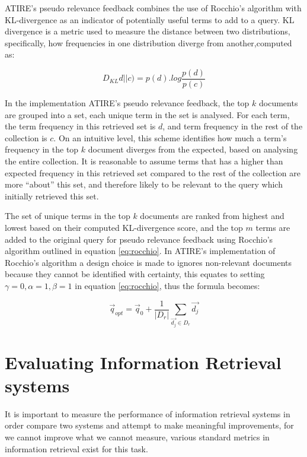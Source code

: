 ATIRE's pseudo relevance feedback combines the use of Rocchio's algorithm with KL-divergence as an indicator of potentially useful terms to add to a query. KL divergence is a metric used to measure the distance between two distributions, specifically, how frequencies in one distribution diverge from another,computed as:

\begin{equation}
D_{KL}{d||c)}= p(d).log\frac{p(d)}{p(c)}
\end{equation}


In the implementation ATIRE's pseudo relevance feedback, the top $k$ documents are grouped into a set, each unique term in the set is analysed. For each term, the term frequency in this retrieved set is $d$, and  term frequency in the rest of the collection is $c$.  On an intuitive level, this scheme identifies how much a term's frequency in the top $k$ document diverges from the expected, based on analysing the entire collection.  It is reasonable to assume terms that has a higher than expected frequency in this retrieved set compared to the rest of the collection are more ``about'' this set, and therefore likely to be relevant to the query which initially retrieved this set. 

The set of unique terms in the top $k$ documents are ranked from highest and lowest based on their computed KL-divergence score, and the top $m$ terms are added to the original query for pseudo relevance feedback using Rocchio's algorithm outlined in equation \ref{eq:rocchio}. In ATIRE's implementation of Rocchio's algorithm a design choice is made to ignores non-relevant documents because they cannot be identified with certainty, this equates to setting  $\gamma=0, \alpha=1, \beta=1$ in equation \ref{eq:rocchio},  thus the formula becomes:

\begin{equation} \label{eq:ATIRE_rocchio}
\vec{q}_{opt} = \vec{q}_0 +   \frac{1}{|D_r|}  \sum_{\vec{d_j} \in D_r} \vec{d_j}  
\end{equation}


 

\section{Evaluating Information Retrieval systems}

It is important to measure the performance of information retrieval systems in order compare two systems and attempt to make meaningful improvements, for we cannot improve what we cannot measure, various standard metrics in information retrieval exist for this task. 

